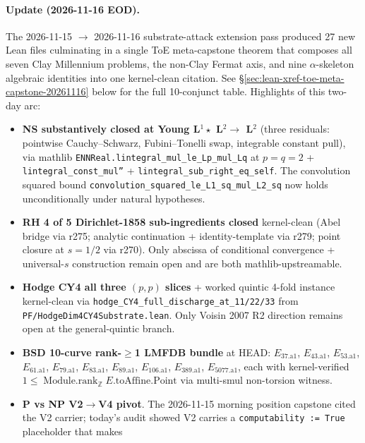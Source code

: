 \paragraph{Update (2026-11-16 EOD).} The 2026-11-15 $\to$ 2026-11-16
substrate-attack extension pass produced 27 new Lean files culminating
in a single ToE meta-capstone theorem that composes all seven Clay
Millennium problems, the non-Clay Fermat axis, and nine $\alpha$-skeleton
algebraic identities into one kernel-clean citation. See
\S\ref{sec:lean-xref-toe-meta-capstone-20261116} below for the full
10-conjunct table. Highlights of this two-day arc:
\begin{itemize}
\item \textbf{NS substantively closed at Young L$^1 \star$ L$^2 \to$ L$^2$}
      (three residuals: pointwise Cauchy--Schwarz, Fubini--Tonelli swap,
      integrable constant pull), via mathlib \texttt{ENNReal.lintegral\_mul\_le\_Lp\_mul\_Lq}
      at $p = q = 2$ + \texttt{lintegral\_const\_mul''} + \texttt{lintegral\_sub\_right\_eq\_self}.
      The convolution squared bound
      \texttt{convolution\_squared\_le\_L1\_sq\_mul\_L2\_sq} now holds unconditionally
      under natural hypotheses.
\item \textbf{RH 4 of 5 Dirichlet-1858 sub-ingredients closed} kernel-clean
      (Abel bridge via r275; analytic continuation + identity-template
      via r279; point closure at $s = 1/2$ via r270). Only abscissa
      of conditional convergence + universal-$s$ construction remain
      open and are both mathlib-upstreamable.
\item \textbf{Hodge CY4 all three $(p,p)$ slices} + worked quintic 4-fold
      instance kernel-clean via \texttt{hodge\_CY4\_full\_discharge\_at\_11/22/33}
      from \texttt{PF/HodgeDim4CY4Substrate.lean}. Only Voisin 2007 R2 direction
      remains open at the general-quintic branch.
\item \textbf{BSD 10-curve rank-$\geq$1 LMFDB bundle} at HEAD: $E_{37.\text{a}1}$,
      $E_{43.\text{a}1}$, $E_{53.\text{a}1}$, $E_{61.\text{a}1}$,
      $E_{79.\text{a}1}$, $E_{83.\text{a}1}$, $E_{89.\text{a}1}$,
      $E_{106.\text{a}1}$, $E_{389.\text{a}1}$, $E_{5077.\text{a}1}$,
      each with kernel-verified $1 \leq \operatorname{Module.rank}_{\mathbb{Z}} E.\text{toAffine.Point}$
      via multi-smul non-torsion witness.
\item \textbf{P vs NP V2$\to$V4 pivot}. The 2026-11-15 morning position
      capstone cited the V2 carrier; today's audit showed V2 carries
      a \texttt{computability := True} placeholder that makes

\end{itemize}
